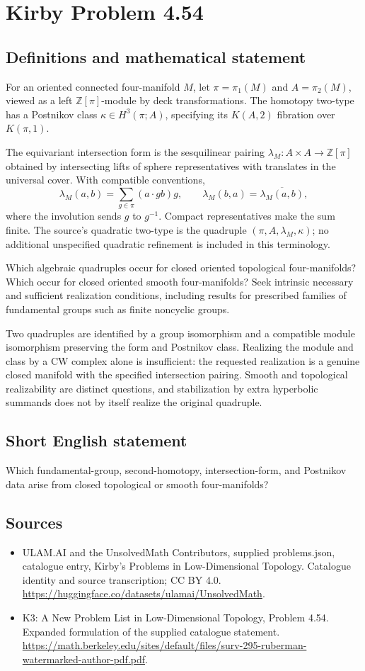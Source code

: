 \documentclass[11pt,a4paper]{article}
\begin{document}
\section*{Kirby Problem 4.54}\label{statement}

\subsection{Definitions and mathematical statement}
For an oriented connected four-manifold $M$, let $\pi=\pi_1(M)$ and $A=\pi_2(M)$, viewed as a left $\mathbb Z[\pi]$-module by deck transformations. The homotopy two-type has a Postnikov class $\kappa\in H^3(\pi;A)$, specifying its $K(A,2)$ fibration over $K(\pi,1)$.

The equivariant intersection form is the sesquilinear pairing $\lambda_M:A\times A\to\mathbb Z[\pi]$ obtained by intersecting lifts of sphere representatives with translates in the universal cover. With compatible conventions,
\[
\lambda_M(a,b)=\sum_{g\in\pi}(a\cdot gb)g,
\qquad \lambda_M(b,a)=\overline{\lambda_M(a,b)},
\]
where the involution sends $g$ to $g^{-1}$. Compact representatives make the sum finite. The source's quadratic two-type is the quadruple $(\pi,A,\lambda_M,\kappa)$; no additional unspecified quadratic refinement is included in this terminology.

Which algebraic quadruples occur for closed oriented topological four-manifolds? Which occur for closed oriented smooth four-manifolds? Seek intrinsic necessary and sufficient realization conditions, including results for prescribed families of fundamental groups such as finite noncyclic groups.

Two quadruples are identified by a group isomorphism and a compatible module isomorphism preserving the form and Postnikov class. Realizing the module and class by a CW complex alone is insufficient: the requested realization is a genuine closed manifold with the specified intersection pairing. Smooth and topological realizability are distinct questions, and stabilization by extra hyperbolic summands does not by itself realize the original quadruple.
\subsection{Short English statement}
Which fundamental-group, second-homotopy, intersection-form, and Postnikov data arise from closed topological or smooth four-manifolds?
\subsection{Sources}
\begin{itemize}
\item[S1] ULAM.AI and the UnsolvedMath Contributors, supplied problems.json, catalogue entry, Kirby's Problems in Low-Dimensional Topology. Catalogue identity and source transcription; CC BY 4.0.
\url{https://huggingface.co/datasets/ulamai/UnsolvedMath}.
\item[S2] K3: A New Problem List in Low-Dimensional Topology, Problem 4.54. Expanded formulation of the supplied catalogue statement.
\url{https://math.berkeley.edu/sites/default/files/surv-295-ruberman-watermarked-author-pdf.pdf}.
\end{itemize}
\end{document}
